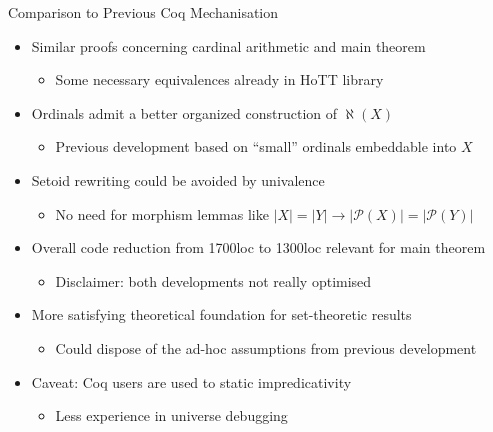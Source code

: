 \documentclass[xcolor=dvipsnames,compress,aspectratio=169,handout]{beamer}
\newcommand{\MCL}[1]{\ensuremath{\mathcal{#1}}\xspace} %
\newcommand{\Pow}{\MCL P}
\begin{document}
\begin{frame}{Comparison to Previous Coq Mechanisation}
	\pause
	\begin{itemize}
		\item
		Similar proofs concerning cardinal arithmetic and main theorem
		\begin{itemize}
			\item Some necessary equivalences already in HoTT library
		\end{itemize}
		\vspace{0.2cm}
		\pause
		\item
		Ordinals admit a better organized construction of $\aleph(X)$
		\begin{itemize}
			\item Previous development based on ``small'' ordinals embeddable into $X$
		\end{itemize}
		\vspace{0.2cm}
		\pause
		\item
		Setoid rewriting could be avoided by univalence
		\begin{itemize}
			\item No need for morphism lemmas like $|X|=|Y|\to |\Pow(X)|=|\Pow(Y)|$
		\end{itemize}
		\vspace{0.2cm}
		\pause
		\item
		Overall code reduction from 1700loc to 1300loc relevant for main theorem
		\begin{itemize}
			\item Disclaimer: both developments not really optimised
		\end{itemize}
		\vspace{0.2cm}
		\pause
		\item
		More satisfying theoretical foundation for set-theoretic results
		\begin{itemize}
			\item
			Could dispose of the ad-hoc assumptions from previous development
		\end{itemize}
		\vspace{0.2cm}
		\pause
		\item
		Caveat: Coq users are used to static impredicativity
		\begin{itemize}
			\item
			Less experience in universe debugging
		\end{itemize}
	\end{itemize}
\end{frame}
\end{document}
